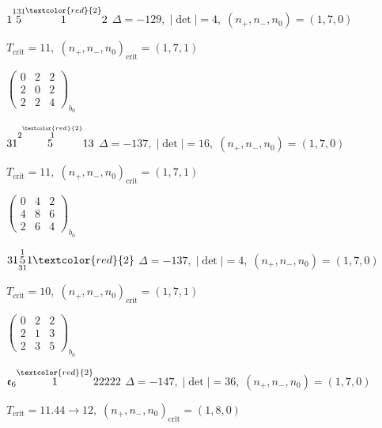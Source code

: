 \documentclass[10pt]{article}
\begin{document}
\smallskip

$1\overset{131}{5}\overset{\textcolor{red}{2}}{1}2$ \quad $\Delta=-129,\; |\det|=4,\; (n_+,n_-,n_0)=(1,7,0)$

\hspace{1em}$T_{\text{crit}}=11,\; (n_+,n_-,n_0)_{\text{crit}}=(1,7,1)$

\hspace{2em}$\left(\begin{smallmatrix}0 & 2 & 2 \\ 2 & 0 & 2 \\ 2 & 2 & 4\end{smallmatrix}\right)_{\!b_0}$

\smallskip

$31\overset{2\overset{\textcolor{red}{2}}{1}}{5}13$ \quad $\Delta=-137,\; |\det|=16,\; (n_+,n_-,n_0)=(1,7,0)$

\hspace{1em}$T_{\text{crit}}=11,\; (n_+,n_-,n_0)_{\text{crit}}=(1,7,1)$

\hspace{2em}$\left(\begin{smallmatrix}0 & 4 & 2 \\ 4 & 8 & 6 \\ 2 & 6 & 4\end{smallmatrix}\right)_{\!b_0}$

\smallskip

$31\overset{1}{\underset{31}{5}}1\textcolor{red}{2}$ \quad $\Delta=-137,\; |\det|=4,\; (n_+,n_-,n_0)=(1,7,0)$

\hspace{1em}$T_{\text{crit}}=10,\; (n_+,n_-,n_0)_{\text{crit}}=(1,7,1)$

\hspace{2em}$\left(\begin{smallmatrix}0 & 2 & 2 \\ 2 & 1 & 3 \\ 2 & 3 & 5\end{smallmatrix}\right)_{\!b_0}$

\smallskip

$\mathfrak{e}_6\overset{\textcolor{red}{2}}{1}22222$ \quad $\Delta=-147,\; |\det|=36,\; (n_+,n_-,n_0)=(1,7,0)$

\hspace{1em}$T_{\text{crit}}=11.44 \to 12,\; (n_+,n_-,n_0)_{\text{crit}}=(1,8,0)$
\end{document}
